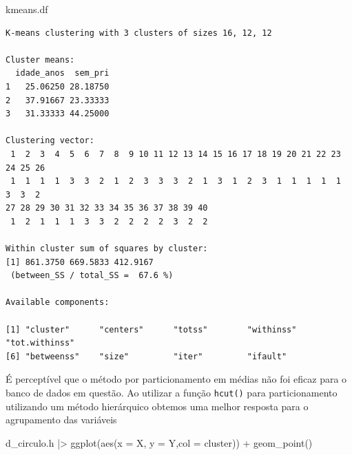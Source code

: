 \documentclass[
  letterpaper,
  DIV=11,
  numbers=noendperiod]{scrreprt}
\newenvironment{Shaded}{\begin{snugshade}}{\end{snugshade}}
\newcommand{\AttributeTok}[1]{\textcolor[rgb]{0.40,0.45,0.13}{#1}}
\newcommand{\DecValTok}[1]{\textcolor[rgb]{0.68,0.00,0.00}{#1}}
\newcommand{\FunctionTok}[1]{\textcolor[rgb]{0.28,0.35,0.67}{#1}}
\newcommand{\NormalTok}[1]{\textcolor[rgb]{0.00,0.23,0.31}{#1}}
\newcommand{\OtherTok}[1]{\textcolor[rgb]{0.00,0.23,0.31}{#1}}
\newcommand{\SpecialCharTok}[1]{\textcolor[rgb]{0.37,0.37,0.37}{#1}}
\newcommand{\StringTok}[1]{\textcolor[rgb]{0.13,0.47,0.30}{#1}}
\begin{document}
\begin{Shaded}
\begin{Highlighting}[]
\NormalTok{kmeans.df}
\end{Highlighting}
\end{Shaded}

\begin{verbatim}
K-means clustering with 3 clusters of sizes 16, 12, 12

Cluster means:
  idade_anos  sem_pri
1   25.06250 28.18750
2   37.91667 23.33333
3   31.33333 44.25000

Clustering vector:
 1  2  3  4  5  6  7  8  9 10 11 12 13 14 15 16 17 18 19 20 21 22 23 24 25 26 
 1  1  1  1  3  3  2  1  2  3  3  3  2  1  3  1  2  3  1  1  1  1  1  3  3  2 
27 28 29 30 31 32 33 34 35 36 37 38 39 40 
 1  2  1  1  1  3  3  2  2  2  2  3  2  2 

Within cluster sum of squares by cluster:
[1] 861.3750 669.5833 412.9167
 (between_SS / total_SS =  67.6 %)

Available components:

[1] "cluster"      "centers"      "totss"        "withinss"     "tot.withinss"
[6] "betweenss"    "size"         "iter"         "ifault"      
\end{verbatim}

É perceptível que o método por particionamento em médias não foi eficaz
para o banco de dados em questão. Ao utilizar a função \texttt{hcut()}
para particionamento utilizando um método hierárquico obtemos uma melhor
resposta para o agrupamento das variáveis

\begin{Shaded}
\end{Shaded}

\begin{Shaded}
\begin{Highlighting}[]
\NormalTok{d\_circulo.h }\SpecialCharTok{|\textgreater{}} 
  \FunctionTok{ggplot}\NormalTok{(}\FunctionTok{aes}\NormalTok{(}\AttributeTok{x =}\NormalTok{ X, }\AttributeTok{y =}\NormalTok{ Y,}\AttributeTok{col =}\NormalTok{ cluster)) }\SpecialCharTok{+}
  \FunctionTok{geom\_point}\NormalTok{()}
\end{Highlighting}
\end{Shaded}
\end{document}
